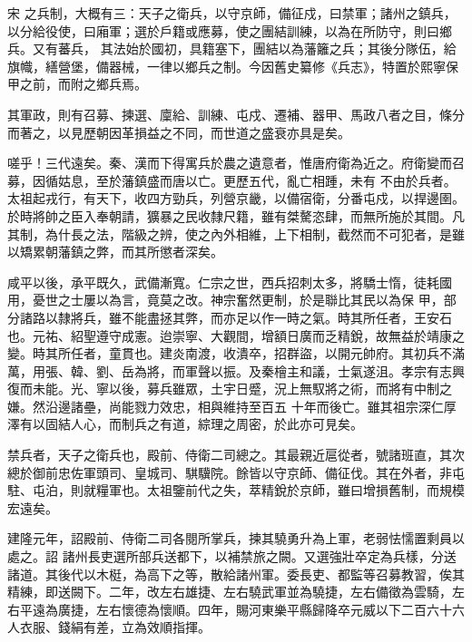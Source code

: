 
\begin{pinyinscope}

 宋
 之兵制，大概有三：天子之衛兵，以守京師，備征戍，曰禁軍；諸州之鎮兵，以分給役使，曰廂軍；選於戶籍或應募，使之團結訓練，以為在所防守，則曰鄉兵。又有蕃兵，
 其法始於國初，具籍塞下，團結以為藩籬之兵；其後分隊伍，給旗幟，繕營堡，備器械，一律以鄉兵之制。今因舊史纂修《兵志》，特置於熙寧保甲之前，而附之鄉兵焉。



 其軍政，則有召募、揀選、廩給、訓練、屯戍、遷補、器甲、馬政八者之目，條分而著之，以見歷朝因革損益之不同，而世道之盛衰亦具是矣。



 嗟乎！三代遠矣。秦、漢而下得寓兵於農之遺意者，惟唐府衛為近之。府衛變而召募，因循姑息，至於藩鎮盛而唐以亡。更歷五代，亂亡相踵，未有
 不由於兵者。太祖起戎行，有天下，收四方勁兵，列營京畿，以備宿衛，分番屯戍，以捍邊圉。於時將帥之臣入奉朝請，獷暴之民收隸尺籍，雖有桀驁恣肆，而無所施於其間。凡其制，為什長之法，階級之辨，使之內外相維，上下相制，截然而不可犯者，是雖以矯累朝藩鎮之弊，而其所懲者深矣。



 咸平以後，承平既久，武備漸寬。仁宗之世，西兵招刺太多，將驕士惰，徒耗國用，憂世之士屢以為言，竟莫之改。神宗奮然更制，於是聯比其民以為保
 甲，部分諸路以隸將兵，雖不能盡拯其弊，而亦足以作一時之氣。時其所任者，王安石也。元祐、紹聖遵守成憲。迨崇寧、大觀間，增額日廣而乏精銳，故無益於靖康之變。時其所任者，童貫也。建炎南渡，收潰卒，招群盜，以開元帥府。其初兵不滿萬，用張、韓、劉、岳為將，而軍聲以振。及秦檜主和議，士氣遂沮。孝宗有志興復而未能。光、寧以後，募兵雖眾，土宇日蹙，況上無馭將之術，而將有中制之嫌。然沿邊諸壘，尚能戮力效忠，相與維持至百五
 十年而後亡。雖其祖宗深仁厚澤有以固結人心，而制兵之有道，綜理之周密，於此亦可見矣。



 禁兵者，天子之衛兵也，殿前、侍衛二司總之。其最親近扈從者，號諸班直，其次總於御前忠佐軍頭司、皇城司、騏驥院。餘皆以守京師、備征伐。其在外者，非屯駐、屯泊，則就糧軍也。太祖鑒前代之失，萃精銳於京師，雖曰增損舊制，而規模宏遠矣。



 建隆元年，詔殿前、侍衛二司各閱所掌兵，揀其驍勇升為上軍，老弱怯懦置剩員以處之。詔
 諸州長吏選所部兵送都下，以補禁旅之闕。又選強壯卒定為兵樣，分送諸道。其後代以木梃，為高下之等，散給諸州軍。委長吏、都監等召募教習，俟其精練，即送闕下。二年，改左右雄捷、左右驍武軍並為驍捷，左右備徵為雲騎，左右平遠為廣捷，左右懷德為懷順。四年，賜河東樂平縣歸降卒元威以下二百六十六人衣服、錢絹有差，立為效順指揮。




\end{pinyinscope}
